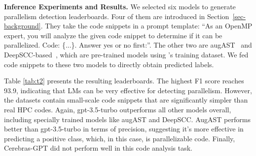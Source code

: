 


\textbf{Inference Experiments and Results.}
We selected six models to generate parallelism detection leaderboards. Four of them are introduced in Section~\ref{sec-background}.  They take the code snippets in a prompt template: ``As an OpenMP expert, you will analyze the given code snippet to determine if it can be parallelized. Code: \{...\}. Answer yes or no first:''. The other two are augAST~\cite{chen2023learning-dataset} and DeepSCC-based~\cite{harel2023learning}, which are pre-trained models using \crawldata's training dataset. We fed code snippets to these two models to directly obtain predicted labels. 

Table \ref{tab:t2} presents the resulting leaderboards. 
The highest F1 score reaches 93.9, indicating that LMs can be very effective for detecting parallelism. However, the datasets contain small-scale code snippets that are significantly simpler than real HPC codes. 
Again, gpt-3.5-turbo outperforms all other models overall, including specially trained models like augAST and DeepSCC.
AugAST performs better than gpt-3.5-turbo in terms of precision, suggesting it's more effective in predicting a positive class, which, in this case, is parallelizable code. 
Finally, Cerebras-GPT did not perform well in this code analysis task. 

